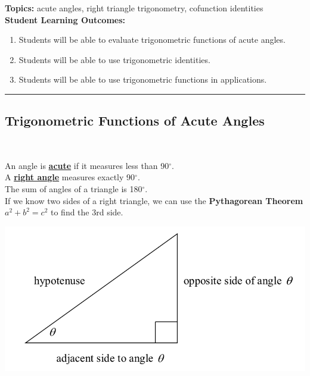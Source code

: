 

\noindent \textbf{Topics:}  acute angles, right triangle trigonometry, cofunction identities\\

\noindent \textbf{Student Learning Outcomes:}
\begin{enumerate}
\item Students will be able to evaluate trigonometric functions of acute angles.
\item Students will be able to use trigonometric identities.
\item Students will be able to use trigonometric functions in applications.
\end{enumerate}

\hrule 

\bigskip

\subsection{Trigonometric Functions of Acute Angles} ~

\noindent An angle is \textbf{\underline{acute}} if it measures less than 90$^{\circ}$.\\
A \textbf{\underline{right angle}} measures exactly 90$^{\circ}$.\\
The sum of angles of a triangle is 180$^{\circ}$.\\[.2in]

\noindent If we know two sides of a right triangle, we can use the \textbf{Pythagorean Theorem} $a^2+b^2=c^2$ to find the 3rd side.

\begin{center}
\includegraphics[scale=.6]{righttriangle}\\
\end{center}


